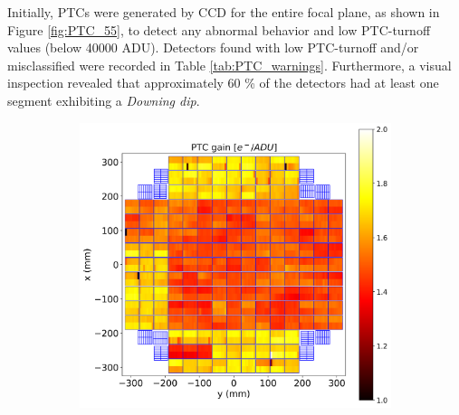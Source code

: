 
Initially, PTCs were generated by CCD for the entire focal plane, as shown in Figure \ref{fig:PTC_55}, to detect any abnormal behavior and low PTC-turnoff values (below 40000 ADU). Detectors found with low PTC-turnoff and/or misclassified were recorded in Table \ref{tab:PTC_warnings}. Furthermore, a visual inspection revealed that approximately 60 \% of the detectors had at least one segment exhibiting a \textit{Downing dip}.

\vspace{3mm}

\begin{figure}[!htb]
 \centering
     \begin{subfigure}[b]{0.49\textwidth}
         \centering
         \includegraphics[width=\textwidth]{Figures/Focal_plane_gain.png}
     \end{subfigure}
     \hfill %
     \begin{subfigure}[b]{0.49\textwidth}
         \centering

\end{subfigure}
\end{figure}
